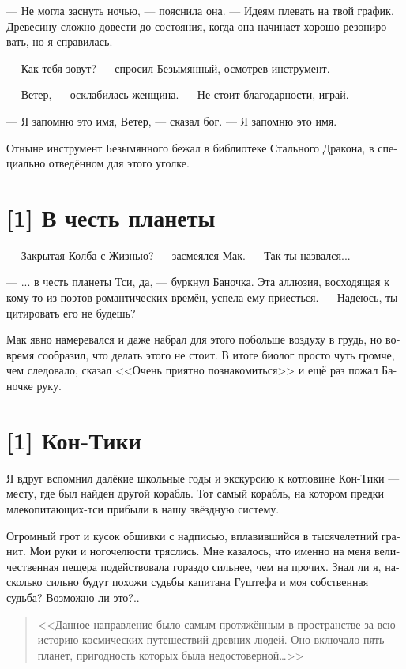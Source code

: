 \documentclass[a4paper,12pt,fleqn]{book}\usepackage{polyglossia}\setdefaultlanguage[babelshorthands=true]{russian}\setotherlanguage{english}\defaultfontfeatures{Ligatures=TeX,Mapping=tex-text}\usepackage{xcolor}\newcommand{\ml}[3]{#2}
\begin{document}
{--- Не могла заснуть ночью, --- пояснила она.
--- Идеям плевать на твой график.
Древесину сложно довести до состояния, когда она начинает хорошо резонировать, но я справилась.

--- Как тебя зовут? --- спросил Безымянный, осмотрев инструмент.

--- Ветер, --- осклабилась женщина.
--- Не стоит благодарности, играй.

--- Я запомню это имя, Ветер, --- сказал бог.
--- Я запомню это имя.

Отныне инструмент Безымянного бежал в библиотеке Стального Дракона, в специально отведённом для этого уголке.

\section{[1] В честь планеты}

--- Закрытая-Колба-с-Жизнью? --- засмеялся Мак.
--- Так ты назвался...

---  ... в честь планеты Тси, да, --- буркнул Баночка.
Эта аллюзия, восходящая к кому-то из поэтов романтических времён, успела ему приесться.
--- Надеюсь, ты цитировать его не будешь?

Мак явно намеревался и даже набрал для этого побольше воздуху в грудь, но вовремя сообразил, что делать этого не стоит.
В итоге биолог просто чуть громче, чем следовало, сказал <<Очень приятно познакомиться>> и ещё раз пожал Баночке руку.

\section{[1] Кон-Тики}

Я вдруг вспомнил далёкие школьные годы и экскурсию к котловине Кон-Тики --- месту, где был найден другой корабль.
Тот самый корабль, на котором предки млекопитающих-тси прибыли в нашу звёздную систему.

Огромный грот и кусок обшивки с надписью, вплавившийся в тысячелетний гранит.
Мои руки и ногочелюсти тряслись.
Мне казалось, что именно на меня величественная пещера подействовала гораздо сильнее, чем на прочих.
Знал ли я, насколько сильно будут похожи судьбы капитана Гуштефа и моя собственная судьба?
Возможно ли это?..

\begin{quote}
<<Данное направление было самым протяжённым в пространстве за всю историю космических путешествий древних людей.
Оно включало пять планет, пригодность которых была недостоверной\ldots>>
\end{quote}

}
\end{document}

